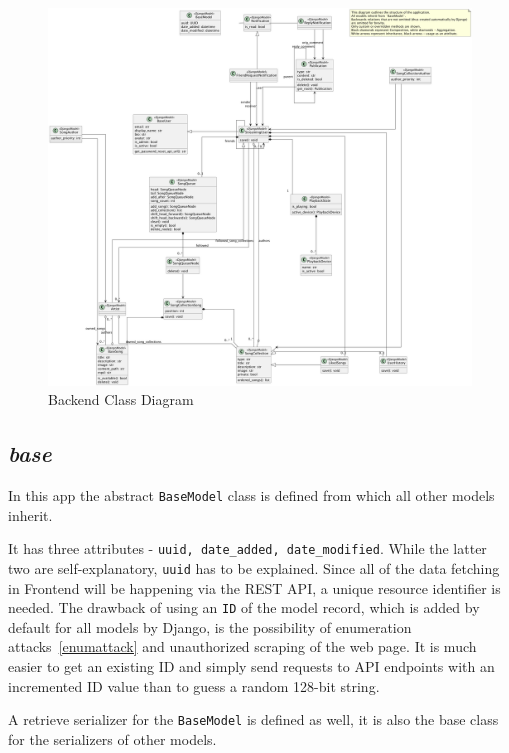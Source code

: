 \begin{figure}[htbp]
    \centering
    \begin{adjustbox}{angle=90, width=1.4\textwidth, center}
        \includegraphics{diagrams/class.png}
    \end{adjustbox}
    \caption{Backend Class Diagram}
    \label{fig:beclassdiagram}
\end{figure}

\subsection{\textit{base}}\label{subsec:base}
In this app the abstract \texttt{BaseModel} class is defined from which all other models inherit.

It has three attributes - \texttt{uuid, date\_added, date\_modified}. While the latter two are self-explanatory,
\texttt{uuid} has to be explained. Since all of the data fetching in Frontend will be happening via the REST API,
a unique resource identifier is needed. The drawback of using an \texttt{ID} of the model record,
which is added by default for all models by Django, is the possibility of enumeration attacks~\ref{enumattack}
and unauthorized scraping of the web page. It is much easier to get an existing ID and
simply send requests to API endpoints with an incremented ID value than to guess a random 128-bit string.

A retrieve serializer for the \texttt{BaseModel} is defined as well,
it is also the base class for the serializers of other models.

